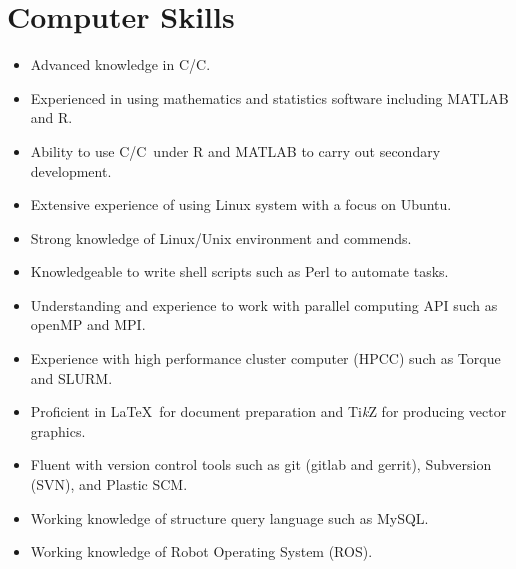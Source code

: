 \documentclass[a4paper,10pt,dvipdfmx]{article}
\def\CC{{C\nolinebreak[4]\hspace{-.05em}\raisebox{.4ex}{\tiny\bf ++}}}
\begin{document}
\section*{Computer Skills}
\begin{itemize}[noitemsep,nolistsep]
  \item Advanced knowledge in C/\CC.
  \item Experienced in using mathematics and statistics software including \textsf{MATLAB} and \textsf{R}.
  \item Ability to use C/\CC~under \textsf{R} and \textsf{MATLAB} to carry out secondary development.
  \item Extensive experience of using Linux system with a focus on Ubuntu.
  \item Strong knowledge of Linux/Unix environment and commends.
  \item Knowledgeable to write shell scripts such as Perl to automate tasks.
  \item Understanding and experience to work with parallel computing API such as openMP and MPI.
  \item Experience with high performance cluster computer (HPCC) such as Torque and SLURM.
  \item Proficient in \LaTeX~for document preparation and Ti\textit{k}Z for producing vector graphics.
  \item Fluent with version control tools such as git (gitlab and gerrit), Subversion (SVN), and Plastic SCM.
  \item Working knowledge of structure query language such as MySQL.
  \item Working knowledge of Robot Operating System (ROS).
\end{itemize}
\end{document}
